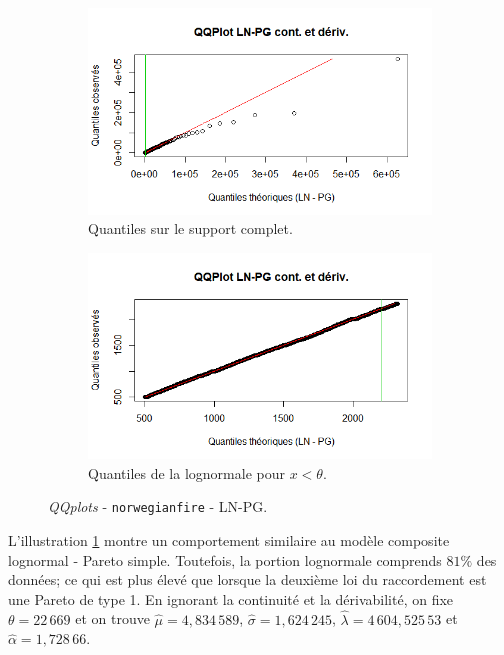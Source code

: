 		\begin{figure}[H]
			\begin{center}
				\begin{subfigure}[b]{0.45\textwidth}
					\includegraphics[scale=0.54]{Graphiques/QQ_LN_PG_condev} 
					\caption{Quantiles sur le support complet.} \label{QQplot_LN_PG_conde}
				\end{subfigure}
				\begin{subfigure}[b]{0.4\textwidth}
					\includegraphics[scale=0.54]{Graphiques/QQ_LN_PA_contdiv_t1} 
					\caption{Quantiles de la lognormale pour $x<\theta$.} \label{QQplot_LN_PG_conde_2}
				\end{subfigure}
				\renewcommand{\figurename}{Illustration}
				\caption{\textit{QQplots} - \texttt{norwegianfire} - LN-PG.}
			\end{center}
		\end{figure}
		
		L'illustration \ref{QQplot_LN_PG_conde} montre un comportement similaire au modèle composite lognormal - Pareto simple. Toutefois, la portion lognormale comprends $81\%$ des données; ce qui est plus élevé que lorsque la deuxième loi du raccordement est une Pareto de type 1. En ignorant la continuité et la dérivabilité, on fixe $\theta = 22\,669$ et on trouve $\hat{\mu} = 4,834\,589$, $\hat{\sigma}=1,624\,245$, $\hat{\lambda} =  4\,604,525\,53$ et $\hat{\alpha} = 1,728\,66$.
		
